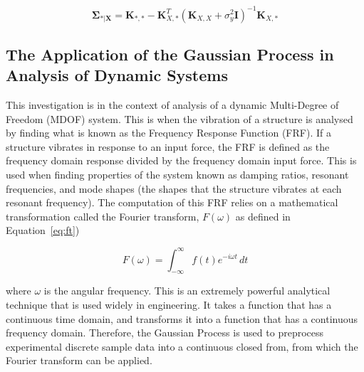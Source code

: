 \documentclass[12pt]{article}
\begin{document}
    \begin{equation}
        \boldsymbol{\Sigma}_{*\vert \mathbf{X}} = \mathbf{K}_{*,*} - \mathbf{K}_{X,*}^T (\mathbf{K}_{X,X} + \sigma^2_y \mathbf{I})^{-1} \mathbf{K}_{X,*}\label{eq:18.53}
    \end{equation}



    \subsection{The Application of the Gaussian Process in Analysis of Dynamic Systems}

    This investigation is in the context of analysis of a dynamic Multi-Degree of Freedom (MDOF) system.
    This is when the vibration of a structure is analysed by finding what is known as the Frequency Response Function (FRF). If a structure vibrates in response to an input force, the FRF is defined as the frequency domain response divided by the frequency domain input force.
    This is used when finding properties of the system known as damping ratios, resonant frequencies, and mode shapes (the shapes that the structure vibrates at each resonant frequency).
    The computation of this FRF relies on a mathematical transformation called the Fourier transform, $F(\omega)$ as defined in Equation~\ref{eq:ft})

    \begin{equation}
        F(\omega) = \int_{-\infty}^{\infty} f(t) e^{-i \omega t} \, dt\label{eq:ft}
    \end{equation}


    where $\omega$ is the angular frequency.
    This is an extremely powerful analytical technique that is used widely in engineering.
    It takes a function that has a continuous time domain, and transforms it into a function that has a continuous frequency domain.
    Therefore, the Gaussian Process is used to preprocess experimental discrete sample data into a continuous closed from, from which the Fourier transform can be applied.
\end{document}
